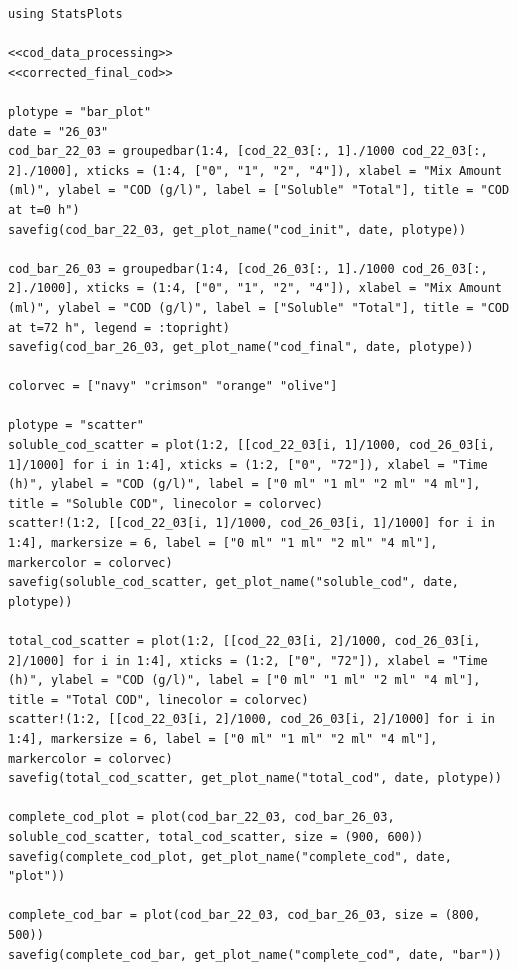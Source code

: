 \documentclass[11pt]{article}
\begin{document}
\begin{verbatim}
using StatsPlots

<<cod_data_processing>>
<<corrected_final_cod>>

plotype = "bar_plot"
date = "26_03"
cod_bar_22_03 = groupedbar(1:4, [cod_22_03[:, 1]./1000 cod_22_03[:, 2]./1000], xticks = (1:4, ["0", "1", "2", "4"]), xlabel = "Mix Amount (ml)", ylabel = "COD (g/l)", label = ["Soluble" "Total"], title = "COD at t=0 h")
savefig(cod_bar_22_03, get_plot_name("cod_init", date, plotype))

cod_bar_26_03 = groupedbar(1:4, [cod_26_03[:, 1]./1000 cod_26_03[:, 2]./1000], xticks = (1:4, ["0", "1", "2", "4"]), xlabel = "Mix Amount (ml)", ylabel = "COD (g/l)", label = ["Soluble" "Total"], title = "COD at t=72 h", legend = :topright)
savefig(cod_bar_26_03, get_plot_name("cod_final", date, plotype))

colorvec = ["navy" "crimson" "orange" "olive"]

plotype = "scatter"
soluble_cod_scatter = plot(1:2, [[cod_22_03[i, 1]/1000, cod_26_03[i, 1]/1000] for i in 1:4], xticks = (1:2, ["0", "72"]), xlabel = "Time (h)", ylabel = "COD (g/l)", label = ["0 ml" "1 ml" "2 ml" "4 ml"], title = "Soluble COD", linecolor = colorvec)
scatter!(1:2, [[cod_22_03[i, 1]/1000, cod_26_03[i, 1]/1000] for i in 1:4], markersize = 6, label = ["0 ml" "1 ml" "2 ml" "4 ml"], markercolor = colorvec)
savefig(soluble_cod_scatter, get_plot_name("soluble_cod", date, plotype))

total_cod_scatter = plot(1:2, [[cod_22_03[i, 2]/1000, cod_26_03[i, 2]/1000] for i in 1:4], xticks = (1:2, ["0", "72"]), xlabel = "Time (h)", ylabel = "COD (g/l)", label = ["0 ml" "1 ml" "2 ml" "4 ml"], title = "Total COD", linecolor = colorvec)
scatter!(1:2, [[cod_22_03[i, 2]/1000, cod_26_03[i, 2]/1000] for i in 1:4], markersize = 6, label = ["0 ml" "1 ml" "2 ml" "4 ml"], markercolor = colorvec)
savefig(total_cod_scatter, get_plot_name("total_cod", date, plotype))

complete_cod_plot = plot(cod_bar_22_03, cod_bar_26_03, soluble_cod_scatter, total_cod_scatter, size = (900, 600))
savefig(complete_cod_plot, get_plot_name("complete_cod", date, "plot"))

complete_cod_bar = plot(cod_bar_22_03, cod_bar_26_03, size = (800, 500))
savefig(complete_cod_bar, get_plot_name("complete_cod", date, "bar"))
\end{verbatim}
\end{document}
